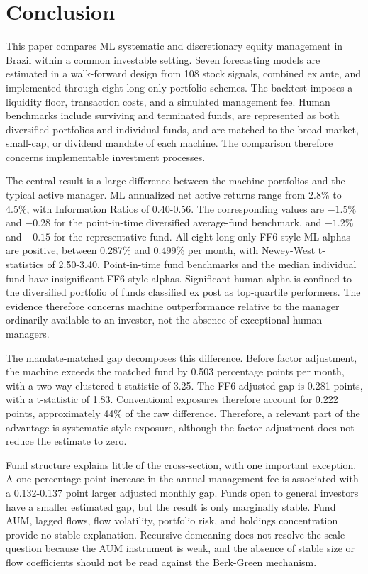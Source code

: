 \documentclass[preprint,12pt,authoryear]{elsarticle}
\begin{document}
\section{Conclusion}

This paper compares ML systematic and discretionary equity management in Brazil within a common investable setting. Seven forecasting models are estimated in a walk-forward design from 108 stock signals, combined ex ante, and implemented through eight long-only portfolio schemes. The backtest imposes a liquidity floor, transaction costs, and a simulated management fee. Human benchmarks include surviving and terminated funds, are represented as both diversified portfolios and individual funds, and are matched to the broad-market, small-cap, or dividend mandate of each machine. The comparison therefore concerns implementable investment processes.

The central result is a large difference between the machine portfolios and the typical active manager. ML annualized net active returns range from 2.8\% to 4.5\%, with Information Ratios of 0.40-0.56. The corresponding values are $-1.5\%$ and $-0.28$ for the point-in-time diversified average-fund benchmark, and $-1.2\%$ and $-0.15$ for the representative fund. All eight long-only FF6-style ML alphas are positive, between 0.287\% and 0.499\% per month, with Newey-West t-statistics of 2.50-3.40. Point-in-time fund benchmarks and the median individual fund have insignificant FF6-style alphas. Significant human alpha is confined to the diversified portfolio of funds classified ex post as top-quartile performers. The evidence therefore concerns machine outperformance relative to the manager ordinarily available to an investor, not the absence of exceptional human managers.

The mandate-matched gap decomposes this difference. Before factor adjustment, the machine exceeds the matched fund by 0.503 percentage points per month, with a two-way-clustered t-statistic of 3.25. The FF6-adjusted gap is 0.281 points, with a t-statistic of 1.83. Conventional exposures therefore account for 0.222 points, approximately 44\% of the raw difference. Therefore, a relevant part of the advantage is systematic style exposure, although the factor adjustment does not reduce the estimate to zero.

Fund structure explains little of the cross-section, with one important exception. A one-percentage-point increase in the annual management fee is associated with a 0.132-0.137 point larger adjusted monthly gap. Funds open to general investors have a smaller estimated gap, but the result is only marginally stable. Fund AUM, lagged flows, flow volatility, portfolio risk, and holdings concentration provide no stable explanation. Recursive demeaning does not resolve the scale question because the AUM instrument is weak, and the absence of stable size or flow coefficients should not be read against the Berk-Green mechanism.
\end{document}
